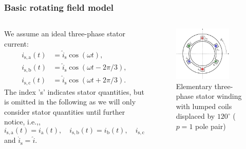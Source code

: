 \begin{frame}
	\frametitle{Basic rotating field model}
    \begin{columns}
		\begin{column}{0.55\textwidth}
	        We assume an ideal three-phase stator current:
            \begin{equation}
                \begin{split}
                    i_\mathrm{s,a}(t) &= \hat{i}_{\mathrm{s}} \cos(\omega t), \\
                    i_\mathrm{s,b}(t) &= \hat{i}_{\mathrm{s}} \cos(\omega t - 2\pi/3), \\
                    i_\mathrm{s,c}(t) &= \hat{i}_{\mathrm{s}} \cos(\omega t + 2\pi/3).
                \end{split}
            \end{equation}
            The index 's' indicates stator quantities, but is omitted in the following as we will only consider stator quantities until further notice, i.e.,, 
            $$i_\mathrm{s,a}(t) = i_\mathrm{a}(t), \quad i_\mathrm{s,b}(t) = i_\mathrm{b}(t), \quad i_\mathrm{s,c}(t) = i_\mathrm{c}(t)$$
            and $\hat{i}_{\mathrm{s}}=\hat{i}$. 
        \end{column}
        \begin{column}{0.45\textwidth}
            \begin{figure}
                \centering
                \includegraphics[width=0.8\textwidth]{fig/lec05/Simple_three_phase_stator_lumped_coils.pdf}
                \caption{Elementary three-phase stator winding with lumped coils  displaced by $120^\circ$ ($p=1$ pole pair)}
                \label{fig:Simple_three_phase_stator_lumped_coils}
            \end{figure}
        \end{column}
    \end{columns}
\end{frame}

